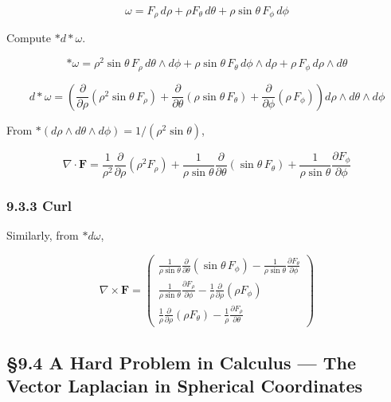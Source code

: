 \documentclass[a4paper,12pt,openany]{book}
\begin{document}
\[\omega = F_\rho\,d\rho + \rho F_\theta\,d\theta + \rho\sin\theta\,F_\phi\,d\phi\]

Compute \(\ast d\ast\omega\).

\[\ast\omega = \rho^2\sin\theta\,F_\rho\,d\theta\wedge d\phi + \rho\sin\theta\,F_\theta\,d\phi\wedge d\rho + \rho\,F_\phi\,d\rho\wedge d\theta\]

\[d\ast\omega = \left(\frac{\partial}{\partial\rho}(\rho^2\sin\theta\,F_\rho) + \frac{\partial}{\partial\theta}(\rho\sin\theta\,F_\theta) + \frac{\partial}{\partial\phi}(\rho\,F_\phi)\right) d\rho\wedge d\theta\wedge d\phi\]

From \(\ast(d\rho\wedge d\theta\wedge d\phi) = 1/(\rho^2\sin\theta)\),

\[\nabla \cdot \mathbf{F} = \frac{1}{\rho^2}\frac{\partial}{\partial\rho}(\rho^2 F_\rho) + \frac{1}{\rho\sin\theta}\frac{\partial}{\partial\theta}(\sin\theta\,F_\theta) + \frac{1}{\rho\sin\theta}\frac{\partial F_\phi}{\partial\phi}\]

\hypertarget{curl-3}{%
\subsubsection{9.3.3 Curl}\label{curl-3}}

Similarly, from \(\ast d\omega\),

\[\nabla \times \mathbf{F} = \begin{pmatrix}
\frac{1}{\rho\sin\theta}\frac{\partial}{\partial\theta}(\sin\theta\,F_\phi) - \frac{1}{\rho\sin\theta}\frac{\partial F_\theta}{\partial\phi} \\[0.3em]
\frac{1}{\rho\sin\theta}\frac{\partial F_\rho}{\partial\phi} - \frac{1}{\rho}\frac{\partial}{\partial\rho}(\rho F_\phi) \\[0.3em]
\frac{1}{\rho}\frac{\partial}{\partial\rho}(\rho F_\theta) - \frac{1}{\rho}\frac{\partial F_\rho}{\partial\theta}
\end{pmatrix}\]

\par\vspace{0.35em}\par

\hypertarget{a-hard-problem-in-calculus-the-vector-laplacian-in-spherical-coordinates}{%
\subsection{§9.4 A Hard Problem in Calculus — The Vector Laplacian in
Spherical
Coordinates}\label{a-hard-problem-in-calculus-the-vector-laplacian-in-spherical-coordinates}}
\end{document}
